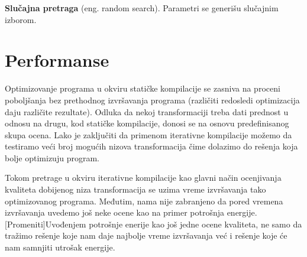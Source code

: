 \documentclass[a4paper]{article}
\begin{document}
\textbf{Slučajna pretraga} (eng. random search). Parametri se generišu slučajnim izborom.

\section{Performanse}
\label{sec:performanse}
Optimizovanje programa u okviru statičke kompilacije se zasniva na proceni poboljšanja 
bez prethodnog izvršavanja programa (različiti redosledi optimizacija daju različite rezultate). 
Odluka da nekoj transformaciji treba dati prednost u odnosu na drugu, kod statičke kompilacije,
donosi se na osnovu predefinisanog skupa ocena. Lako je zaključiti da primenom iterativne kompilacije 
možemo da testiramo veći broj mogućih nizova transformacija čime dolazimo do rešenja koja bolje optimizuju
program. 

\par
Tokom pretrage u okviru iterativne kompilacije kao glavni način ocenjivanja kvaliteta dobijenog niza transformacija
 se uzima vreme izvršavanja tako optimizovanog programa. Međutim, nama nije zabranjeno da pored vremena izvršavanja
 uvedemo još neke ocene kao na primer potrošnja energije. [Promeniti]Uvođenjem potrošnje enerije kao još jedne ocene kvaliteta,
  ne samo da tražimo rešenje koje nam daje najbolje vreme izvršavanja već i rešenje koje će nam samnjiti utrošak energije.
\end{document}

